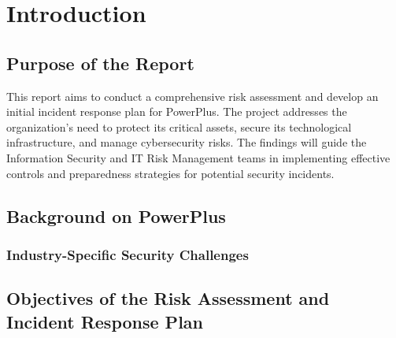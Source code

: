 \chapter{Introduction}

\section{Purpose of the Report}

This report aims to conduct a comprehensive risk assessment and develop an initial incident response plan for PowerPlus. The project addresses the organization's need to protect its critical assets, secure its technological infrastructure, and manage cybersecurity risks. The findings will guide the Information Security and IT Risk Management teams in implementing effective controls and preparedness strategies for potential security incidents.

\section{Background on PowerPlus}


\subsection{Industry-Specific Security Challenges}


\section{Objectives of the Risk Assessment and Incident Response Plan}


